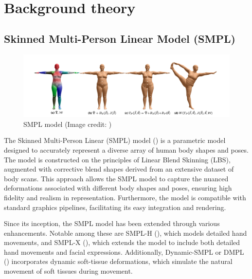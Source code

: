 \chapter{Background theory} \label{sec:methods}

\section{Skinned Multi-Person Linear Model (SMPL)}
\begin{figure}[h]
    \centering
    \includegraphics[width=\linewidth]{figures/smpl.png}
    \caption{SMPL model (Image credit: \cite{SMPL:2015})}
\end{figure}
The Skinned Multi-Person Linear (SMPL) model (\cite{SMPL:2015}) is a parametric model designed to accurately represent a diverse array of human body shapes and poses. The model is constructed on the principles of Linear Blend Skinning (LBS), augmented with corrective blend shapes derived from an extensive dataset of body scans. This approach allows the SMPL model to capture the nuanced deformations associated with different body shapes and poses, ensuring high fidelity and realism in representation. Furthermore, the model is compatible with standard graphics pipelines, facilitating its easy integration and rendering.

Since its inception, the SMPL model has been extended through various enhancements. Notable among these are SMPL-H (\cite{MANO:SIGGRAPHASIA:2017}), which models detailed hand movements, and SMPL-X (\cite{SMPL-X:2019}), which extends the model to include both detailed hand movements and facial expressions. Additionally, Dynamic-SMPL or DMPL (\cite{SMPL:2015}) incorporates dynamic soft-tissue deformations, which simulate the natural movement of soft tissues during movement.

